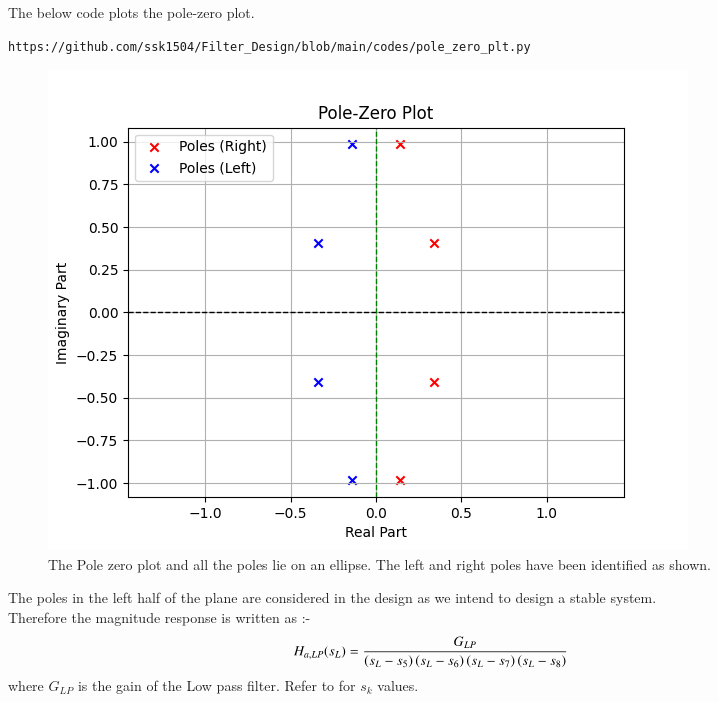 \documentclass{article}
\begin{document}
\begin{enumerate}
The below code plots the pole-zero plot.
\begin{lstlisting}
https://github.com/ssk1504/Filter_Design/blob/main/codes/pole_zero_plt.py
\end{lstlisting}
\begin{figure}[H]
\centering
\includegraphics[width=1\columnwidth]{figs/Pole_Zero_plt.png}
\caption{The Pole zero plot and all the poles lie on an ellipse. The left and right poles have been identified as shown.}
\label{fig:pole_zero_plt}
\end{figure}
The poles in the left half of the plane are considered in the design as we intend to design a stable system.\\
Therefore the magnitude response is written as :- 
\begin{align}
    H_{a,LP}(s_L) &= \frac{G_{LP}}{\left(s_L-s_5\right)\left(s_L-s_6\right)\left(s_L-s_7\right)\left(s_L-s_8\right)}
\end{align}
where $G_{LP}$ is the gain of the Low pass filter. Refer to  for $s_k$ values.\\


\end{enumerate}
\end{document}

